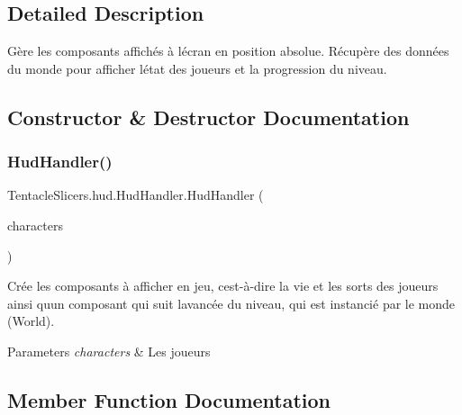 \subsection{Detailed Description}
Gère les composants affichés à l\textquotesingle{}écran en position absolue. Récupère des données du monde pour afficher l\textquotesingle{}état des joueurs et la progression du niveau. 



\subsection{Constructor \& Destructor Documentation}
\mbox{\label{class_tentacle_slicers_1_1hud_1_1_hud_handler_a0566cbce018f4f281f7286dad1a76d34}} 
\subsubsection{\texorpdfstring{Hud\+Handler()}{HudHandler()}}
{\footnotesize\ttfamily Tentacle\+Slicers.\+hud.\+Hud\+Handler.\+Hud\+Handler (\begin{DoxyParamCaption}\item[{I\+Read\+Only\+List$<$ \hyperlink{class_tentacle_slicers_1_1actors_1_1_player_character}{Player\+Character} $>$}]{characters }\end{DoxyParamCaption})}



Crée les composants à afficher en jeu, c\textquotesingle{}est-\/à-\/dire la vie et les sorts des joueurs ainsi qu\textquotesingle{}un composant qui suit l\textquotesingle{}avancée du niveau, qui est instancié par le monde (World). 


\begin{DoxyParams}{Parameters}
{\em characters} & Les joueurs \\
\hline
\end{DoxyParams}


\subsection{Member Function Documentation}
\mbox{\label{class_tentacle_slicers_1_1hud_1_1_hud_handler_a61718275f1f7d9a57d63a6b5588737f8}} 
